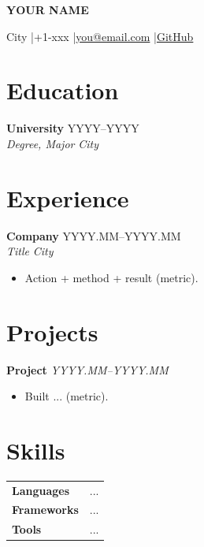 \documentclass[10pt]{ctexart}
\newcommand{\name}[1]{\begin{center}\LARGE\bfseries #1\end{center}\vspace{-4mm}}
\newcommand{\contact}[1]{\begin{center}\footnotesize #1\end{center}\vspace{-4mm}}
\newcommand{\summary}[1]{\begin{center}\small #1\end{center}\vspace{-3mm}}
\newcommand{\entry}[4]{\textbf{#1} \hfill #2\\ \textit{#3} \hfill \textit{#4}\\}
\newcommand{\proj}[2]{\textbf{#1} \hfill \textit{#2}\\}
\newcommand{\skillrow}[2]{\textbf{#1} & #2 \\}
\begin{document}
\name{YOUR NAME}
\contact{City \quad|\quad +1-xxx \quad|\quad \href{mailto:you@email.com}{you@email.com} \quad|\quad \href{https://github.com/you}{GitHub}}


\section{Education}
\entry{University}{YYYY--YYYY}{Degree, Major}{City}

\section{Experience}
\entry{Company}{YYYY.MM--YYYY.MM}{Title}{City}
\begin{itemize}
  \item Action + method + result (metric).
\end{itemize}

\section{Projects}
\proj{Project}{YYYY.MM--YYYY.MM}
\begin{itemize}
  \item Built ... (metric).
\end{itemize}

\section{Skills}
\begin{tabularx}{\linewidth}{@{}l X@{}}
  \skillrow{Languages}{...}
  \skillrow{Frameworks}{...}
  \skillrow{Tools}{...}
\end{tabularx}

\end{document}
